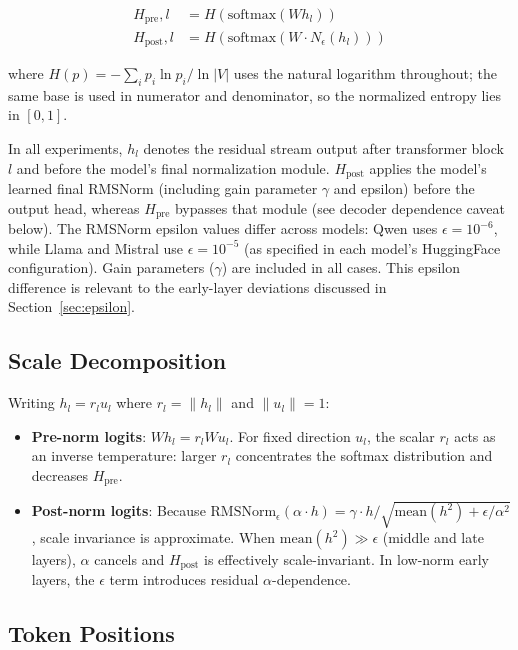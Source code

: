 \documentclass{ieeeaccess}
\newcommand{\Hpre}{H_{\text{pre}}}
\newcommand{\Hpost}{H_{\text{post}}}
\begin{document}
\begin{align}
\Hpre{,l} &= H(\text{softmax}(W h_l)) \label{eq:hpre} \\
\Hpost{,l} &= H(\text{softmax}(W \cdot N_\epsilon(h_l))) \label{eq:hpost}
\end{align}

\noindent where $H(p) = -\sum_i p_i \ln p_i / \ln |V|$ uses the natural logarithm throughout; the same base is used in numerator and denominator, so the normalized entropy lies in $[0, 1]$.

In all experiments, $h_l$ denotes the residual stream output after transformer block $l$ and before the model's final normalization module. $\Hpost$ applies the model's learned final RMSNorm (including gain parameter $\gamma$ and epsilon) before the output head, whereas $\Hpre$ bypasses that module (see decoder dependence caveat below). The RMSNorm epsilon values differ across models: Qwen uses $\epsilon = 10^{-6}$, while Llama and Mistral use $\epsilon = 10^{-5}$ (as specified in each model's HuggingFace configuration). Gain parameters ($\gamma$) are included in all cases. This epsilon difference is relevant to the early-layer deviations discussed in Section~\ref{sec:epsilon}.

\subsection{Scale Decomposition}

Writing $h_l = r_l u_l$ where $r_l = \|h_l\|$ and $\|u_l\| = 1$:

\begin{itemize}
\item \textbf{Pre-norm logits}: $W h_l = r_l W u_l$. For fixed direction $u_l$, the scalar $r_l$ acts as an inverse temperature: larger $r_l$ concentrates the softmax distribution and decreases $\Hpre$.
\item \textbf{Post-norm logits}: Because $\text{RMSNorm}_\epsilon(\alpha \cdot h) = \gamma \cdot h / \sqrt{\text{mean}(h^2) + \epsilon/\alpha^2}$, scale invariance is approximate. When $\text{mean}(h^2) \gg \epsilon$ (middle and late layers), $\alpha$ cancels and $\Hpost$ is effectively scale-invariant. In low-norm early layers, the $\epsilon$ term introduces residual $\alpha$-dependence.
\end{itemize}

\subsection{Token Positions}
\end{document}
